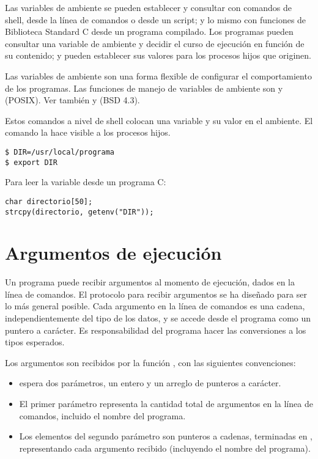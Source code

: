 Las variables de ambiente se pueden
establecer y consultar con comandos de shell, desde la línea de comandos o
desde un script; y lo mismo con funciones de Biblioteca Standard C desde un
programa compilado. Los programas pueden consultar una variable de ambiente y
decidir el curso de ejecución en función de su contenido; y pueden establecer
sus valores para los procesos hijos que originen. 

Las variables de ambiente son
una forma flexible de configurar el comportamiento de los programas.
Las funciones de manejo de variables de ambiente son  y  (POSIX).
Ver también  y  (BSD 4.3).

\begin{ejemplo}
Estos comandos a nivel de shell colocan una variable y su valor en el ambiente.
El comando  la hace visible a los procesos hijos.

\begin{lstlisting}
$ DIR=/usr/local/programa
$ export DIR
\end{lstlisting}

Para leer la variable desde un programa C:
\begin{lstlisting}
char directorio[50];
strcpy(directorio, getenv("DIR"));
\end{lstlisting}
\end{ejemplo}

\section{Argumentos de ejecución}
Un programa puede recibir argumentos al momento de ejecución, dados en la línea
de comandos. El protocolo para recibir argumentos se ha diseñado para ser lo
más general posible. Cada argumento en la línea de comandos es una cadena,
independientemente del tipo de los datos, y se accede desde el programa como un
puntero a carácter. Es responsabilidad del programa hacer las conversiones a
los tipos esperados.

Los argumentos son recibidos por la función , con las siguientes convenciones:
\begin{itemize}
	\item {} espera dos parámetros, un entero y un arreglo de punteros a
      carácter.
	\item El primer parámetro representa la cantidad total de argumentos en la
      línea de comandos, incluido el nombre del programa.
	\item Los elementos del segundo parámetro son punteros a cadenas, terminadas en
      , representando cada argumento recibido (incluyendo el nombre del
      programa).
\end{itemize}
      
